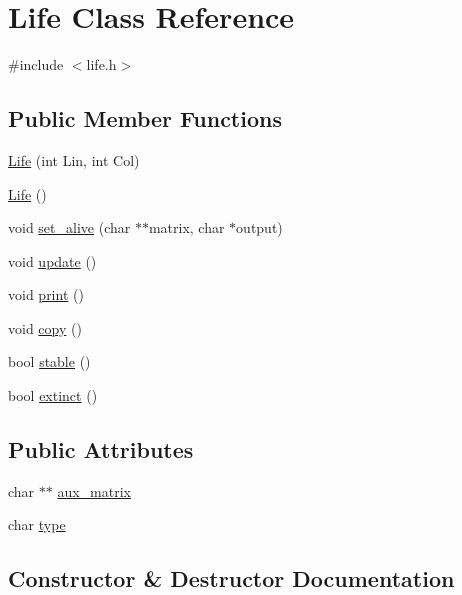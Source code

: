 \hypertarget{classLife}{}\section{Life Class Reference}
\label{classLife}


{\ttfamily \#include $<$life.\+h$>$}

\subsection*{Public Member Functions}
\begin{DoxyCompactItemize}
\item 
\hyperlink{classLife_a08477d04bc4bf98837c9e37b041f2d35}{Life} (int Lin, int Col)
\item 
\hyperlink{classLife_a6de2a371f6f778f8b4938d219390b746}{Life} ()
\item 
void \hyperlink{classLife_a6ccd51752d8955b6171547fa57b14db3}{set\+\_\+alive} (char $\ast$$\ast$matrix, char $\ast$output)
\item 
void \hyperlink{classLife_a0e00f2735584f3ddebb397742b520d3b}{update} ()
\item 
void \hyperlink{classLife_a502bd46fefb24950e64865ce87c4b670}{print} ()
\item 
void \hyperlink{classLife_a1e7183d91f5c7f8935915daaf33a5f93}{copy} ()
\item 
bool \hyperlink{classLife_a49c95a25d20e9eabf940305f99bcf2c3}{stable} ()
\item 
bool \hyperlink{classLife_a988f58733428b7957d52ca85fecdb21d}{extinct} ()
\end{DoxyCompactItemize}
\subsection*{Public Attributes}
\begin{DoxyCompactItemize}
\item 
char $\ast$$\ast$ \hyperlink{classLife_a207d51f8631df0fbda12a23e2b6b112f}{aux\+\_\+matrix}
\item 
char \hyperlink{classLife_a32121ce5b98c0b7d8b1b0f2a5f1114aa}{type}
\end{DoxyCompactItemize}


\subsection{Constructor \& Destructor Documentation}
